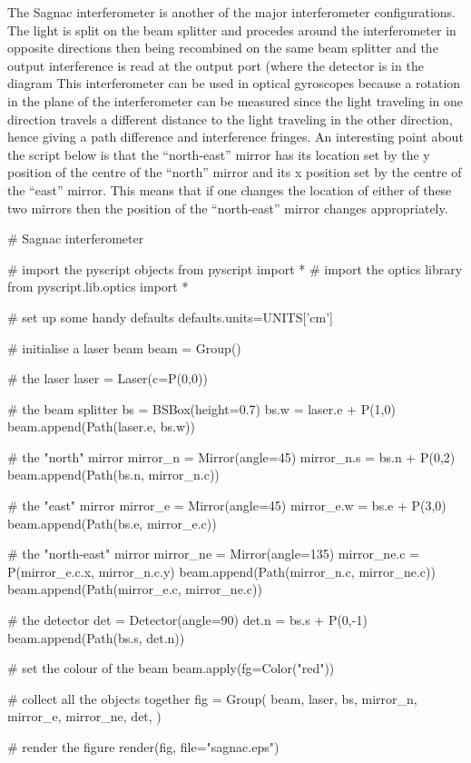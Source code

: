 The Sagnac interferometer is another of the major interferometer
configurations.  The light is split on the beam splitter and procedes around
the interferometer in opposite directions then being recombined on the same
beam splitter and the output interference is read at the output port (where
the detector is in the diagram  This interferometer can be used in optical
gyroscopes because a rotation in the plane of the interferometer can be
measured since the light traveling in one direction travels a different
distance to the light traveling in the other direction, hence giving a path
difference and interference fringes.  An interesting point about the script
below is that the ``north-east'' mirror has its location set by the y
position of the centre of the ``north'' mirror and its x position set by the
centre of the ``east'' mirror.  This means that if one changes the location
of either of these two mirrors then the position of the ``north-east''
mirror changes appropriately.

\begin{python}
# Sagnac interferometer

# import the pyscript objects
from pyscript import *
# import the optics library
from pyscript.lib.optics import *

# set up some handy defaults
defaults.units=UNITS['cm']

# initialise a laser beam
beam = Group()

# the laser
laser = Laser(c=P(0,0))

# the beam splitter
bs = BSBox(height=0.7)
bs.w = laser.e + P(1,0)
beam.append(Path(laser.e, bs.w))

# the "north" mirror
mirror_n = Mirror(angle=45)
mirror_n.s = bs.n + P(0,2)
beam.append(Path(bs.n, mirror_n.c))

# the "east" mirror
mirror_e = Mirror(angle=45)
mirror_e.w = bs.e + P(3,0)
beam.append(Path(bs.e, mirror_e.c))

# the "north-east" mirror
mirror_ne = Mirror(angle=135)
mirror_ne.c = P(mirror_e.c.x, mirror_n.c.y)
beam.append(Path(mirror_n.c, mirror_ne.c))
beam.append(Path(mirror_e.c, mirror_ne.c))

# the detector
det = Detector(angle=90)
det.n = bs.s + P(0,-1)
beam.append(Path(bs.s, det.n))

# set the colour of the beam
beam.apply(fg=Color("red"))

# collect all the objects together
fig = Group(
        beam,
        laser,
        bs,
        mirror_n, mirror_e, mirror_ne,
        det,
        )

# render the figure
render(fig, 
        file="sagnac.eps")
\end{python}

